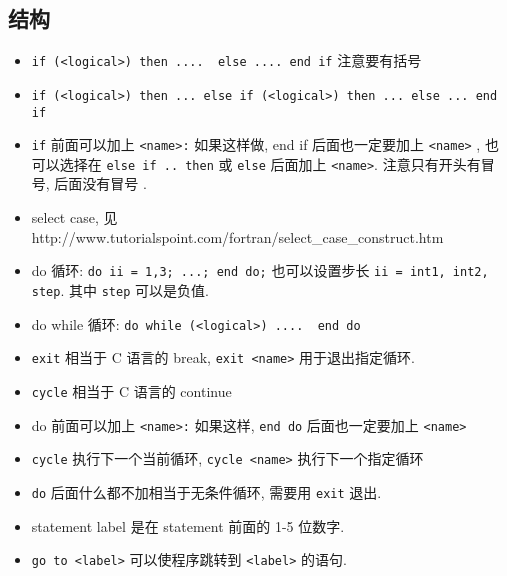 \subsection{结构}
\begin{itemize}
\item \verb`if (<logical>) then ....  else .... end if` 注意要有括号
\item \verb`if (<logical>) then ... else if (<logical>) then ... else ... end if`
\item \verb`if` 前面可以加上 \verb`<name>:` 如果这样做,  end if 后面也一定要加上 \verb`<name>`  , 也可以选择在 \verb`else if .. then` 或 \verb`else` 后面加上 \verb`<name>`. 注意只有开头有冒号, 后面没有冒号 .
\item select case, 见 http://www.tutorialspoint.com/fortran/select_case_construct.htm
\item do 循环:   \verb`do ii = 1,3; ...; end do;` 也可以设置步长 \verb`ii = int1, int2, step`. 其中 \verb`step` 可以是负值.
\item do while 循环: \verb`do while (<logical>) ....  end do`
\item \verb`exit` 相当于 C 语言的 break, \verb`exit <name>` 用于退出指定循环.
\item \verb`cycle` 相当于 C 语言的 continue
\item do 前面可以加上 \verb`<name>:` 如果这样, \verb`end do` 后面也一定要加上 \verb`<name>`
\item \verb`cycle` 执行下一个当前循环, \verb`cycle <name>` 执行下一个指定循环
\item \verb`do` 后面什么都不加相当于无条件循环, 需要用 \verb`exit` 退出.
\item statement label 是在 statement 前面的 1-5 位数字.
\item \verb`go to <label>` 可以使程序跳转到 \verb`<label>` 的语句.
\end{itemize}

